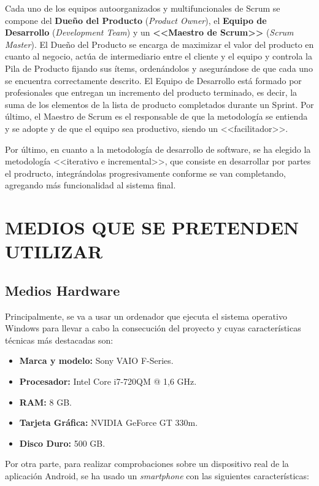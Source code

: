 \documentclass{pre-tfg}
\begin{document}
Cada uno de los equipos autoorganizados y multifuncionales de Scrum se compone del \textbf{Dueño del Producto} (\textit{Product Owner}), el \textbf{Equipo de Desarrollo} (\textit{Development Team}) y un \textbf{<<Maestro de Scrum>>} (\textit{Scrum Master}). El Dueño del Producto se encarga de maximizar el valor del producto en cuanto al negocio, actúa de intermediario entre el cliente y el equipo y controla la Pila de Producto fijando sus ítems, ordenándolos y asegurándose de que cada uno se encuentra correctamente descrito. El Equipo de Desarrollo está formado por profesionales que entregan un incremento del producto terminado, es decir, la suma de los elementos de la lista de producto completados durante un Sprint. Por último, el Maestro de Scrum es el responsable de que la metodología se entienda y se adopte y de que el equipo sea productivo, siendo un <<facilitador>>. 

Por último, en cuanto a la metodología de desarrollo de software, se ha elegido la metodología <<iterativo e incremental>>, que consiste en desarrollar por partes el prodructo, integrándolas progresivamente conforme se van completando, agregando más funcionalidad al sistema final.

\section{MEDIOS QUE SE PRETENDEN UTILIZAR}

\subsection{Medios Hardware}
Principalmente, se va a usar un ordenador que ejecuta el sistema operativo Windows para llevar a cabo la consecución del proyecto y cuyas características técnicas más destacadas son:

\begin{itemize}
	\item \textbf{Marca y modelo:} Sony VAIO F-Series.
	\item \textbf{Procesador:} Intel\textregistered{ } Core\texttrademark{ } i7-720QM @ 1,6 GHz.
	\item \textbf{RAM:} 8 GB.
	\item \textbf{Tarjeta Gráfica:} NVIDIA GeForce GT 330m.
	\item \textbf{Disco Duro:} 500 GB.
\end{itemize}

Por otra parte, para realizar comprobaciones sobre un dispositivo real de la aplicación Android, se ha usado un \textit{smartphone} con las siguientes características:
\end{document}
